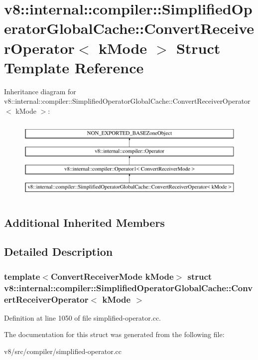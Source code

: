 \hypertarget{structv8_1_1internal_1_1compiler_1_1SimplifiedOperatorGlobalCache_1_1ConvertReceiverOperator}{}\section{v8\+:\+:internal\+:\+:compiler\+:\+:Simplified\+Operator\+Global\+Cache\+:\+:Convert\+Receiver\+Operator$<$ k\+Mode $>$ Struct Template Reference}
\label{structv8_1_1internal_1_1compiler_1_1SimplifiedOperatorGlobalCache_1_1ConvertReceiverOperator}
Inheritance diagram for v8\+:\+:internal\+:\+:compiler\+:\+:Simplified\+Operator\+Global\+Cache\+:\+:Convert\+Receiver\+Operator$<$ k\+Mode $>$\+:\begin{figure}[H]
\begin{center}
\leavevmode
\includegraphics[height=4.000000cm]{structv8_1_1internal_1_1compiler_1_1SimplifiedOperatorGlobalCache_1_1ConvertReceiverOperator}
\end{center}
\end{figure}
\subsection*{Additional Inherited Members}


\subsection{Detailed Description}
\subsubsection*{template$<$Convert\+Receiver\+Mode k\+Mode$>$\newline
struct v8\+::internal\+::compiler\+::\+Simplified\+Operator\+Global\+Cache\+::\+Convert\+Receiver\+Operator$<$ k\+Mode $>$}



Definition at line 1050 of file simplified-\/operator.\+cc.



The documentation for this struct was generated from the following file\+:\begin{DoxyCompactItemize}
\item 
v8/src/compiler/simplified-\/operator.\+cc\end{DoxyCompactItemize}
